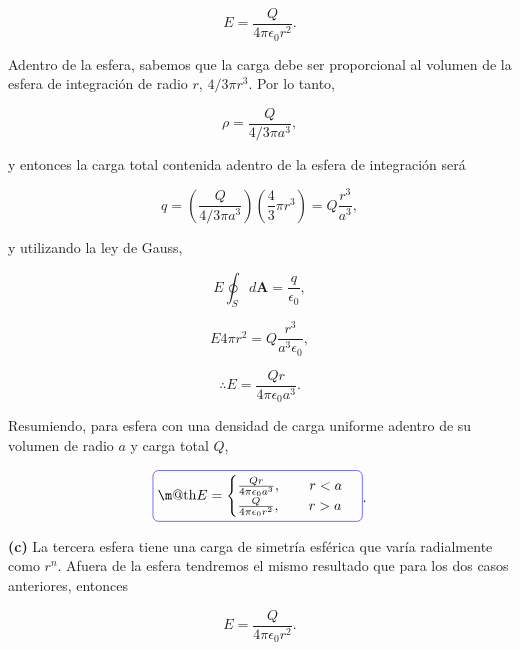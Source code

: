 \documentclass[a4paper,10pt]{article}
\makeatletter
\numberwithin{equation}{section}
\newcommand*{\boxcolor}{blue}
\renewcommand{\boxed}[1]{\textcolor{\boxcolor}{%
\tikz[baseline={([yshift=-1ex]current bounding box.center)}] \node [rectangle, minimum width=1ex,rounded corners,draw] {\normalcolor\m@th$\displaystyle#1$};}}
\makeatother
\begin{document}
\begin{equation}
 E = \frac{Q}{4\pi \epsilon_0 r^2}.
\end{equation}

Adentro de la esfera, sabemos que la carga debe ser proporcional al volumen de la 
esfera de integración de radio $r$, $4/3\pi r^3$. Por lo tanto, 

\begin{equation}
 \rho = \frac{Q}{4/3\pi a^3},
\end{equation}

y entonces la carga total contenida adentro de la esfera de integración será

\begin{equation}
 q = \left(\frac{Q}{4/3\pi a^3}\right)\left(\frac{4}{3}\pi r^3\right) = 
 Q\frac{r^3}{a^3}, 
\end{equation}

y utilizando la ley de Gauss, 

\begin{equation}
 E \oint_S d\mathbf{A} = \frac{q}{\epsilon_0},
\end{equation}

\begin{equation}
 E 4\pi r^2 = Q\frac{r^3}{a^3\epsilon_0},
\end{equation}

\begin{equation}
 \therefore E = \frac{Qr}{4\pi \epsilon_0 a^3}.
\end{equation}

Resumiendo, para esfera con una densidad de carga 
uniforme adentro de su volumen de radio $a$ y carga total $Q$,

\begin{equation}
\boxed{
  E =\begin{cases}
	      \frac{Qr}{4\pi \epsilon_0 a^3} , \quad  \quad r < a \\
	      \frac{Q}{4\pi \epsilon_0 r^2} , \quad \quad r > a
	       \end{cases}}.
\end{equation}

\textbf{(c)} La tercera esfera tiene una carga de simetría esférica que varía 
radialmente como $r^n$. Afuera de la esfera tendremos el mismo resultado que 
para los dos casos anteriores, entonces 

\begin{equation}
 E = \frac{Q}{4\pi \epsilon_0 r^2}.
\end{equation}
\end{document}
